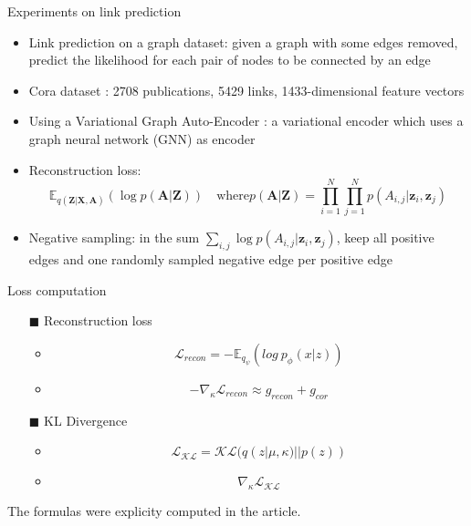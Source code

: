 \begin{frame}{Experiments on link prediction}

  \begin{itemize}
    \item Link prediction on a graph dataset: given a graph with some edges removed, predict the likelihood
    for each pair of nodes to be connected by an edge
    \item Cora dataset \cite{McCallum_2000}: 2708 publications, 5429 links, 1433-dimensional feature vectors
    \item Using a Variational Graph Auto-Encoder \cite{kipf_variational_2016}: a variational encoder which uses a
    graph neural network (GNN) as encoder
    \item Reconstruction loss:
        $$ \mathbb{E}_{q(\mathbf{Z}|\mathbf{X}, \mathbf{A})}(\log p(\mathbf{A}|\mathbf{Z})) \quad 
        \text{where} p(\mathbf{A}|\mathbf{Z}) = \prod_{i = 1}^N \prod_{j=1}^N p(A_{i, j}|\mathbf{z}_i, \mathbf{z}_j) $$
    \item Negative sampling: in the sum $\sum_{i, j} \log p(A_{i, j}|\mathbf{z}_i, \mathbf{z}_j)$, keep all
    positive edges and one randomly sampled negative edge per positive edge
  \end{itemize}
\end{frame}


\begin{frame}{Loss computation}

  \begin{itemize}
    \item[$\blacksquare$] Reconstruction loss
      \begin{itemize}
        \item $$\mathcal{L}_{recon} =  - \mathbb{E}_{q_{\psi}}( log\ p_{\phi}(x | z)) $$
        \item$$ -\nabla_{\kappa} \mathcal{L}_{recon} \approx g_{recon} + g_{cor} $$ 
      \end{itemize}
    \item[$\blacksquare$] KL Divergence 
        \begin{itemize}
          \item $$ \mathcal{L}_{\mathcal{KL}} = \mathcal{KL}(q(z|\mu, \kappa) || p(z)) $$
          \item $$ \nabla_{\kappa} \mathcal{L}_{\mathcal{KL}} $$
        \end{itemize}
  \end{itemize}
  The formulas were explicity computed in the article.
  
\end{frame}

